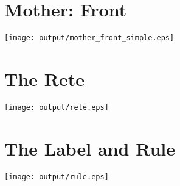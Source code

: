 \documentclass[a4paper,onecolumn,10pt]{article}
\begin{document}
\section*{Mother: Front}
\label{mother_front}
\vspace{-1cm}\centerline{\texttt{[image: output/mother\_front\_simple.eps]}}
\section*{The Rete}
\label{rete}
\vspace{1.5cm}\centerline{\texttt{[image: output/rete.eps]}}
\section*{The Label and Rule}
\label{rule}
\centerline{\texttt{[image: output/rule.eps]}}
\end{document}
